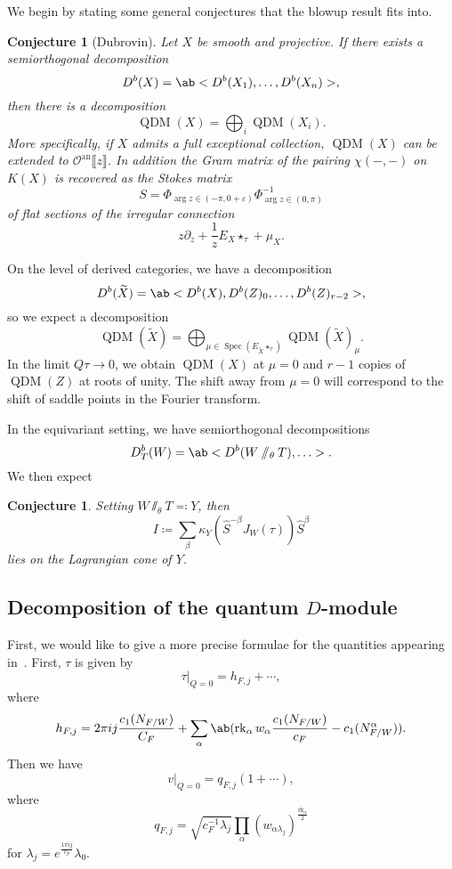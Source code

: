 \documentclass[leqno, openany]{memoir}
\newtheorem{conj}[thm]{Conjecture}
\theoremstyle{definition}
\theoremstyle{remark}
\theoremstyle{plain}
\theoremstyle{definition}
\theoremstyle{remark}
\newcommand{\ep}{\varepsilon}
\newcommand{\mc}[1]{\mathcal{#1}}
\newcommand{\mr}[1]{\mathrm{#1}}
\newcommand{\on}[1]{\operatorname{#1}}
\newcommand{\wt}[1]{\widetilde{#1}}
\newcommand{\wh}[1]{\widehat{#1}}
\DeclareMathOperator{\Spec}{Spec}
\DeclareMathOperator{\QDM}{QDM}
\begin{document}
We begin by stating some general conjectures that the blowup result fits into.

\begin{conj}[Dubrovin]
    Let $X$ be smooth and projective. If there exists a semiorthogonal decomposition
    \[ D^b(X) = \ab<D^b(X_1), \ldots, D^b(X_n)>, \]
    then there is a decomposition
    \[ \QDM(X) = \bigoplus_i \QDM(X_i). \]
    More specifically, if $X$ admits a full exceptional collection, $\QDM(X)$ can be extended to $\mc{O}^{\mr{an}}\llbracket z \rrbracket$. In addition the Gram matrix of the pairing $\chi(-,-)$ on $K(X)$ is recovered as the Stokes matrix
    \[ S = \Phi_{\on{arg} z \in (-\pi, 0+\ep)} \Phi^{-1}_{\on{arg} z \in (0,\pi)} \]
    of flat sections of the irregular connection
    \[ z \partial_z + \frac{1}{z}E_X \star_{\tau} + \mu_X. \]
\end{conj}

On the level of derived categories, we have a decomposition
\[ D^b(\wt{X}) = \ab< D^b(X), D^b(Z)_0, \ldots, D^b(Z)_{r-2}>, \]
so we expect a decomposition
\[ \QDM(\wt{X}) = \bigoplus_{\mu \in \Spec(E_{\wt{X}} \star_{\tau})} \QDM(\wt{X})_{\mu}. \]
In the limit $Q\tau \to 0$, we obtain $\QDM(X)$ at $\mu = 0$ and $r-1$ copies of $\QDM(Z)$ at roots of unity. The shift away from $\mu = 0$ will correspond to the shift of saddle points in the Fourier transform.

In the equivariant setting, we have semiorthogonal decompositions
\[ D^b_T(W) = \ab<D^b(W\sslash_{\theta} T), \ldots>. \]
We then expect
\begin{conj}
    Setting $W \sslash_{\theta} T \eqqcolon Y$, then
    \[ I \coloneqq \sum_{\beta} \kappa_Y(\wh{S}^{-\beta} J_W(\tau)) \wh{S}^{\beta} \]
    lies on the Lagrangian cone of $Y$.
\end{conj}


\subsection{Decomposition of the quantum $D$-module}%
\label{sub:Decomposition of the quantum D module}

First, we would like to give a more precise formulae for the quantities appearing in~. First, $\tau$ is given by
\[ \tau|_{Q=0} = h_{F,j} + \cdots, \]
where
\[ h_{F,j} = 2 \pi i j \frac{c_1(N_{F/W})}{C_F} + \sum_{\alpha} \ab(\on{rk}_{\alpha} w_{\alpha} \frac{c_1(N_{F/W})}{c_F} - c_1(N_{F/W}^{\alpha})). \]
Then we have
\[ v|_{Q=0} = q_{F,j}(1+ \cdots), \]
where
\[ q_{F,j} = \sqrt{c_F^{-1} \lambda_j} \prod_{\alpha} (w_{\alpha \lambda_j})^{\frac{\on{rk}_{\alpha}}{2}} \]
for $\lambda_j = e^{\frac{1\pi i j}{c_F}} \lambda_0$.
\end{document}
